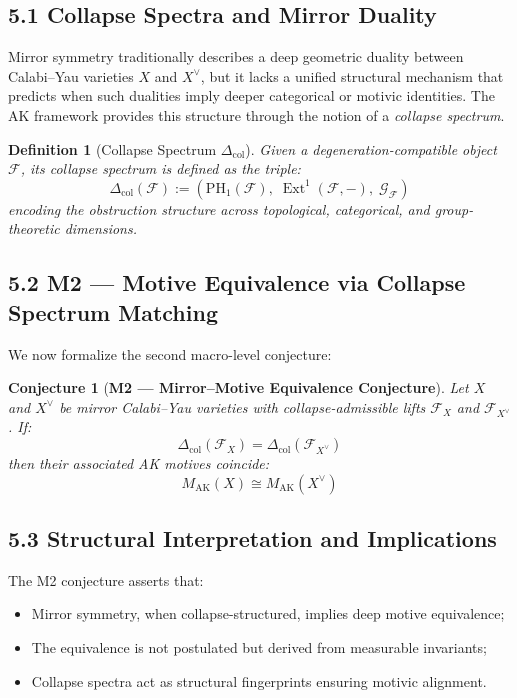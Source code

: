 \documentclass[11pt]{article}
\newtheorem{definition}[theorem]{Definition}
\newtheorem{conjecture}{Conjecture}[section]
\DeclareMathOperator{\Ext}{Ext}
\begin{document}
\subsection{5.1 Collapse Spectra and Mirror Duality}

Mirror symmetry traditionally describes a deep geometric duality between Calabi–Yau varieties $X$ and $X^{\vee}$, but it lacks a unified structural mechanism that predicts when such dualities imply deeper categorical or motivic identities. The AK framework provides this structure through the notion of a \textit{collapse spectrum}.

\begin{definition}[Collapse Spectrum $\Delta_{\mathrm{col}}$]
Given a degeneration-compatible object $\mathcal{F}$, its collapse spectrum is defined as the triple:
\[
\Delta_{\mathrm{col}}(\mathcal{F}) := \left( \mathrm{PH}_1(\mathcal{F}),\; \Ext^1(\mathcal{F}, -),\; \mathcal{G}_{\mathcal{F}} \right)
\]
encoding the obstruction structure across topological, categorical, and group-theoretic dimensions.
\end{definition}

\subsection{5.2 M2 — Motive Equivalence via Collapse Spectrum Matching}

We now formalize the second macro-level conjecture:

\begin{conjecture}[\textbf{M2 — Mirror–Motive Equivalence Conjecture}]
Let $X$ and $X^{\vee}$ be mirror Calabi–Yau varieties with collapse-admissible lifts $\mathcal{F}_X$ and $\mathcal{F}_{X^{\vee}}$. If:
\[
\Delta_{\mathrm{col}}(\mathcal{F}_X) = \Delta_{\mathrm{col}}(\mathcal{F}_{X^{\vee}})
\]
then their associated AK motives coincide:
\[
\boxed{M_{\mathrm{AK}}(X) \cong M_{\mathrm{AK}}(X^{\vee})}
\]
\end{conjecture}


\subsection{5.3 Structural Interpretation and Implications}

The M2 conjecture asserts that:

\begin{itemize}
    \item Mirror symmetry, when collapse-structured, implies deep motive equivalence;
    \item The equivalence is not postulated but derived from measurable invariants;
    \item Collapse spectra act as structural fingerprints ensuring motivic alignment.
\end{itemize}
\end{document}

